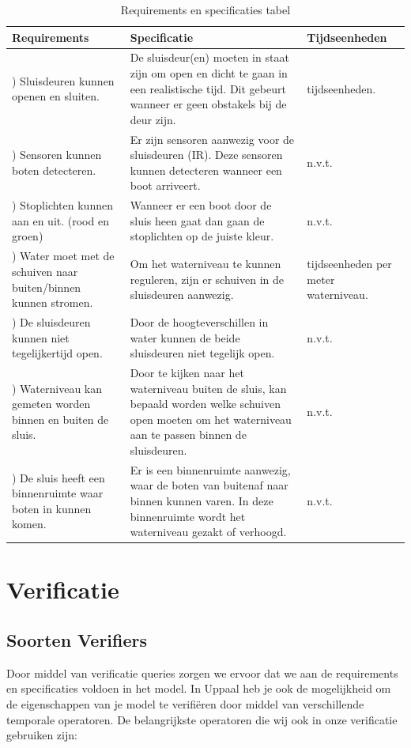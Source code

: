 \documentclass[oneside]{scrbook}
\begin{document}
\begin{table}[h!]
\begin{tabularx}{1\textwidth} { | >{\raggedright\arraybackslash}X | >{\centering\arraybackslash}X | >{\raggedleft\arraybackslash}X |}
   \hline
   Requirements & Specificatie & Tijdseenheden \\
   \hline
   1) Sluisdeuren kunnen openen en sluiten. & De sluisdeur(en) moeten in staat zijn om open en dicht te gaan in een realistische tijd. Dit gebeurt wanneer er geen obstakels bij de deur zijn. & 5 tijdseenheden.\\
   \hline
   2) Sensoren kunnen boten detecteren. & Er zijn sensoren aanwezig voor de sluisdeuren (IR). Deze sensoren kunnen detecteren wanneer een boot arriveert. & n.v.t. \\
   \hline
    3) Stoplichten kunnen aan en uit. (rood en groen) & Wanneer er een boot door de sluis heen gaat dan gaan de stoplichten op de juiste kleur. & n.v.t.\\
   \hline
   4) Water moet met de schuiven naar buiten/binnen kunnen stromen. & Om het waterniveau te kunnen reguleren, zijn er schuiven in de sluisdeuren aanwezig. & 2 tijdseenheden per meter waterniveau. \\
   \hline
   5) De sluisdeuren kunnen niet tegelijkertijd open. & Door de hoogteverschillen in water kunnen de beide sluisdeuren niet tegelijk open. & n.v.t. \\
   \hline
   6) Waterniveau kan gemeten worden binnen en buiten de sluis. & Door te kijken naar het waterniveau buiten de sluis, kan bepaald worden welke schuiven open moeten om het waterniveau aan te passen binnen de sluisdeuren. & n.v.t. \\
   \hline
   7) De sluis heeft een binnenruimte waar boten in kunnen komen. & Er is een binnenruimte aanwezig, waar de boten van buitenaf naar binnen kunnen varen. In deze binnenruimte wordt het waterniveau gezakt of verhoogd. & n.v.t. \\
   \hline
\end{tabularx}
 \caption{Requirements en specificaties tabel}
 \label{table:1}
\end{table}


\chapter{Verificatie}
\section{Soorten Verifiers}
Door middel van verificatie queries zorgen we ervoor dat we aan de requirements en specificaties voldoen in het model. In Uppaal heb je ook de mogelijkheid om de eigenschappen van je model te verifiëren door middel van verschillende temporale operatoren. De belangrijkste operatoren die wij ook in onze verificatie gebruiken zijn:
\end{document}
